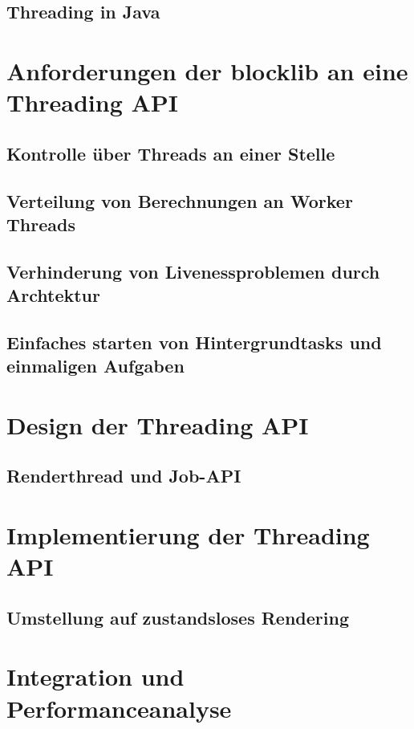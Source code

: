 \documentclass[12pt,a4paper,listof=totocnumbered,parskip=half]{scrreprt}
\begin{document}
\subsection{Threading in Java}

\section{Anforderungen der blocklib an eine Threading API}
\subsection{Kontrolle über Threads an einer Stelle}

\subsection{Verteilung von Berechnungen an Worker Threads}
\subsection{Verhinderung von Livenessproblemen durch Archtektur}
\subsection{Einfaches starten von Hintergrundtasks und einmaligen Aufgaben}

\section{Design der Threading API}

\subsection{Renderthread und Job-API}


\section{Implementierung der Threading API}


\subsection{Umstellung auf zustandsloses Rendering}

\section{Integration und Performanceanalyse}
\end{document}

